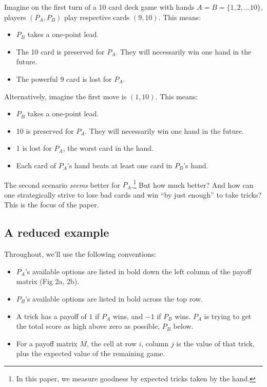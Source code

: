\documentclass[11pt, oneside]{article} 	%
\begin{document}
Imagine on the first turn of a 10 card deck game with hands $A=B=\{1, 2, ... 10\}$, players $(P_A, P_B)$ play respective cards $(9, 10)$. This means:
\begin{itemize}
\item $P_B$ takes a one-point lead.
\item The 10 card is preserved for $P_A$. They will necessarily win one hand in the future.
\item The powerful 9 card is lost for $P_A$.
\end{itemize}

Alternatively, imagine the first move is $(1,10)$. This means:

\begin{itemize}
\item $P_B$ takes a one-point lead.
\item 10 is preserved for $P_A$. They will necessarily win one hand in the future.
\item 1 is lost for $P_A$, the worst card in the hand.
\item Each card of $P_A$'s hand beats at least one card in $P_B$'s hand.
\end{itemize}

The second scenario \emph{seems} better for $P_A$.\footnote{In this paper, we measure goodness by expected tricks taken by the hand.} But how much better? And how can one strategically strive to lose bad cards and win ``by just enough'' to take tricks? This is the focus of the paper.

\subsection{A reduced example}

Throughout, we'll use the following conventions:
\begin{itemize}
\item $P_A$'s available options are listed in bold down the left column of the payoff matrix (Fig 2a, 2b).
\item $P_B$'s available options are listed in bold across the top row.
\item A trick has a payoff of $1$ if $P_A$ wins, and $-1$ if $P_B$ wins. $P_A$ is trying to get the total score as high above zero as possible, $P_B$ below.
\item For a payoff matrix $M$, the cell at row $i$, column $j$ is the value of that trick, plus the expected value of the remaining game.
\end{itemize}
\end{document}

